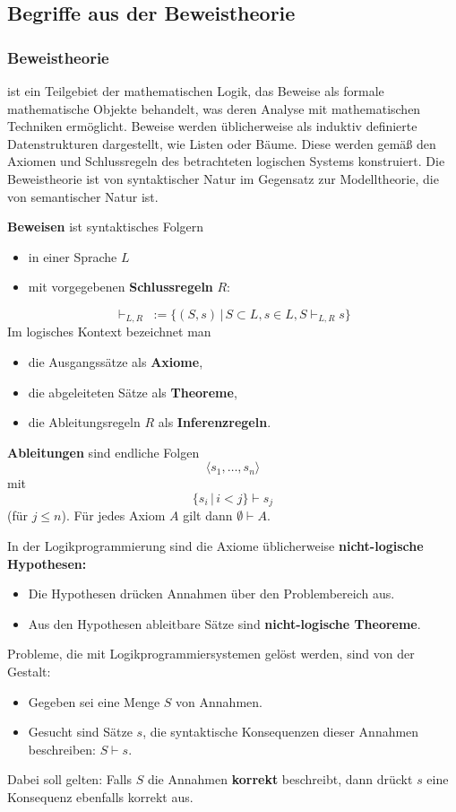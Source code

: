 \documentclass[runningheads,deutsch]{llncs}
\begin{document}
\subsection{Begriffe aus der Beweistheorie}

\subsubsection{Beweistheorie}
ist ein Teilgebiet der mathematischen Logik, das Beweise als formale mathematische Objekte behandelt, was deren Analyse mit mathematischen Techniken ermöglicht. Beweise werden üblicherweise als induktiv definierte Datenstrukturen dargestellt, wie Listen oder Bäume. Diese werden gemäß den Axiomen und Schlussregeln des betrachteten logischen Systems konstruiert. Die Beweistheorie ist von syntaktischer Natur im Gegensatz zur Modelltheorie, die von semantischer Natur ist. 

\textbf{Beweisen} ist syntaktisches Folgern
\begin{itemize}
    \item in einer Sprache $L$
    \item mit vorgegebenen \textbf{Schlussregeln} $R$:
\end{itemize}

\[ \vdash_{L,R}\; := \{(S, s) \, |\, S \subset L, s \in L, S \vdash_{L,R} s\} \]
%
Im logisches Kontext bezeichnet man
\begin{itemize}
    \item die Ausgangssätze als \textbf{Axiome},
    \item die abgeleiteten Sätze als \textbf{Theoreme},
    \item die Ableitungsregeln $R$ als \textbf{Inferenzregeln}.
\end{itemize}
%
\textbf{Ableitungen} sind endliche Folgen
\[ \langle s_1, \dots, s_n\rangle \]
mit
\[ \{s_i \, |\, i < j\} \vdash s_j \]
(für $j \leq n$).
Für jedes Axiom $A$ gilt dann $\emptyset \vdash A$.

In der Logikprogrammierung sind die Axiome üblicherweise \textbf{nicht-logische Hypothesen:}
\begin{itemize}
    \item Die Hypothesen drücken Annahmen über den Problembereich aus.
    \item Aus den Hypothesen ableitbare Sätze sind \textbf{nicht-logische Theoreme}.
\end{itemize}
%
Probleme, die mit Logikprogrammiersystemen gelöst werden, sind von der Gestalt:
\begin{itemize}
    \item Gegeben sei eine Menge $S$ von Annahmen.
    \item Gesucht sind Sätze $s$, die syntaktische Konsequenzen dieser Annahmen beschreiben: $S \vdash s$.
\end{itemize}
%
Dabei soll gelten: Falls $S$ die Annahmen \textbf{korrekt} beschreibt, dann drückt $s$ eine Konsequenz ebenfalls korrekt aus.
\end{document}
